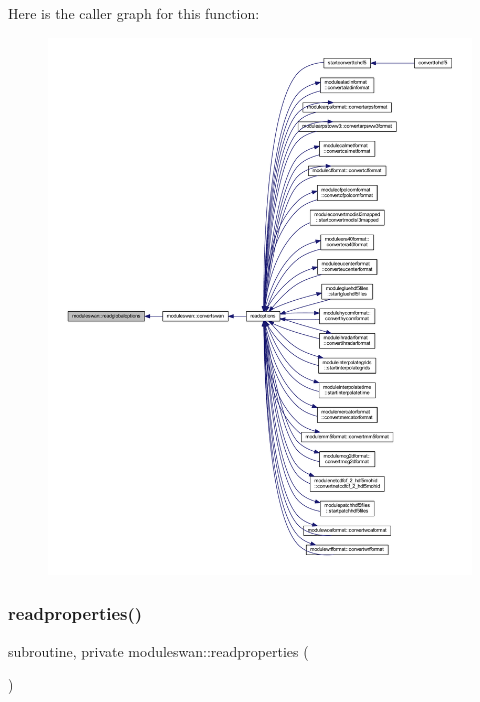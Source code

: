 Here is the caller graph for this function\+:\nopagebreak
\begin{figure}[H]
\begin{center}
\leavevmode
\includegraphics[width=350pt]{namespacemoduleswan_a98f6d123b6575342a8d84ba663e5a265_icgraph}
\end{center}
\end{figure}
\mbox{\label{namespacemoduleswan_a15e0f14f5229674aebdd25f0a49a7df2}} 
\subsubsection{\texorpdfstring{readproperties()}{readproperties()}}
{\footnotesize\ttfamily subroutine, private moduleswan\+::readproperties (\begin{DoxyParamCaption}{ }\end{DoxyParamCaption})\hspace{0.3cm}{\ttfamily [private]}}

